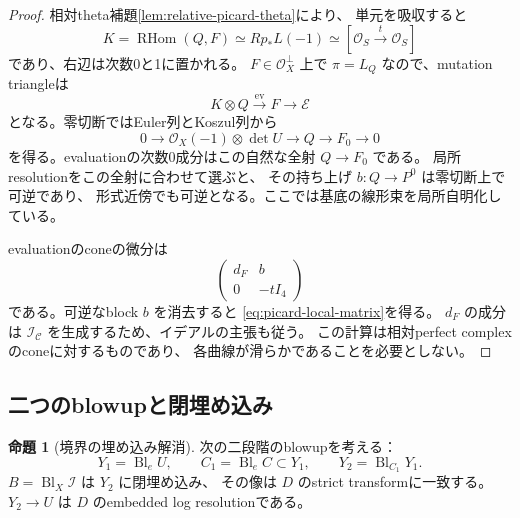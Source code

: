 \documentclass[a4paper,11pt]{ltjsarticle}
\newcommand{\mathscr}{\mathcal}
\theoremstyle{definition}
\newtheorem{theorem}{命題}[section]
\newcommand{\OO}{\mathcal O}
\newcommand{\RHom}{\operatorname{RHom}}
\begin{document}
\begin{proof}
相対theta補題\ref{lem:relative-picard-theta}により、
単元を吸収すると
\[
 K=\RHom(Q,F)\simeq Rp_*L(-1)
   \simeq[\OO_S\xrightarrow{t}\OO_S]
\]
であり、右辺は次数0と1に置かれる。
$F\in\OO_X^\perp$ 上で $\pi=L_Q$ なので、mutation triangleは
\[
 K\otimes Q\xrightarrow{\mathrm{ev}}F\longrightarrow\mathcal E
\]
となる。零切断ではEuler列とKoszul列から
\[
 0\longrightarrow\OO_X(-1)\otimes\det U
 \longrightarrow Q\longrightarrow F_0\longrightarrow0
\]
を得る。evaluationの次数0成分はこの自然な全射 $Q\to F_0$ である。
局所resolutionをこの全射に合わせて選ぶと、
その持ち上げ $b:Q\to P^0$ は零切断上で可逆であり、
形式近傍でも可逆となる。ここでは基底の線形束を局所自明化している。

evaluationのconeの微分は
\[
 \begin{pmatrix}
  d_F&b\\
  0&-tI_4
 \end{pmatrix}
\]
である。可逆なblock $b$ を消去すると
\eqref{eq:picard-local-matrix}を得る。
$d_F$ の成分は $\mathcal I_{\mathscr C}$ を生成するため、イデアルの主張も従う。
この計算は相対perfect complexのconeに対するものであり、
各曲線が滑らかであることを必要としない。
\end{proof}

\subsection{二つのblowupと閉埋め込み}

\begin{theorem}[境界の埋め込み解消]\label{thm:bn-double-blowup}
次の二段階のblowupを考える：
\[
 Y_1=\operatorname{Bl}_eU,\qquad
 C_1=\operatorname{Bl}_eC\subset Y_1,\qquad
 Y_2=\operatorname{Bl}_{C_1}Y_1.
\]
$B=\operatorname{Bl}_X\mathcal I$ は $Y_2$ に閉埋め込み、
その像は $D$ のstrict transformに一致する。
$Y_2\to U$ は $D$ のembedded log resolutionである。
\end{theorem}
\end{document}
